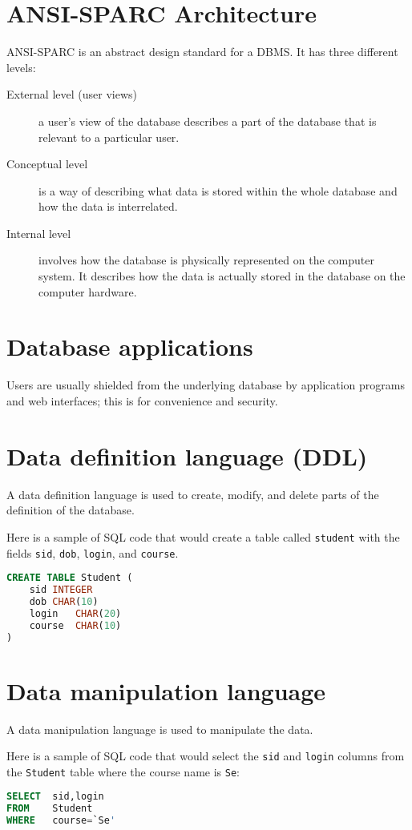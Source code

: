 \section{ANSI-SPARC Architecture}
ANSI-SPARC is an abstract design standard for a DBMS. 
It has three different levels:
\begin{description}
	\item[External level (user views)] a user's view of the database describes a part of the database that is relevant to a particular user.
	\item[Conceptual level] is a way of describing what data is stored within the whole database and how the data is interrelated. 
	\item[Internal level] involves how the database is physically represented on the computer system. It describes how the data is actually stored in the database on the computer hardware.
\end{description}




\section{Database applications}
Users are usually shielded from the underlying database by application programs and web interfaces; this is for convenience and security.

\section{Data definition language (DDL)}
A data definition language is used to create, modify, and delete parts of the definition of the database.

Here is a sample of SQL code that would create a table called \verb|student| with the fields \verb|sid|, \verb|dob|, \verb|login|, and \verb|course|.
\begin{lstlisting}[language=SQL]
CREATE TABLE Student (
	sid	INTEGER
	dob	CHAR(10)
	login	CHAR(20)
	course	CHAR(10)
)
\end{lstlisting}

\section{Data manipulation language}
A data manipulation language is used to manipulate the data.

Here is a sample of SQL code that would select the \verb|sid| and \verb|login| columns from the \verb|Student| table where the course name is \verb|Se|:
\begin{lstlisting}[language=SQL]
SELECT	sid,login
FROM	Student
WHERE	course=`Se'
\end{lstlisting}

